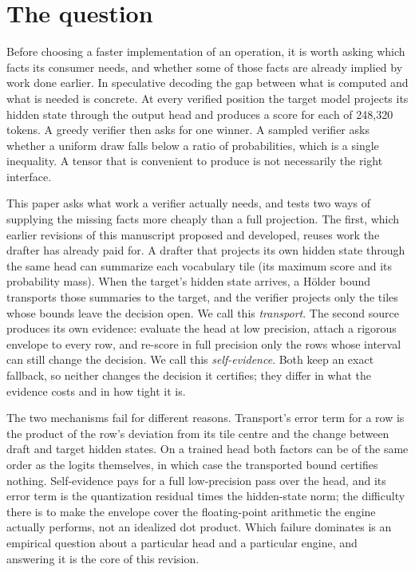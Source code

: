 \section{The question}\label{sec:question}
Before choosing a faster implementation of an operation, it is worth asking which facts its consumer needs, and whether some of those facts are already implied by work done earlier. In speculative decoding the gap between what is computed and what is needed is concrete. At every verified position the target model projects its hidden state through the output head and produces a score for each of 248,320 tokens. A greedy verifier then asks for one winner. A sampled verifier asks whether a uniform draw falls below a ratio of probabilities, which is a single inequality. A tensor that is convenient to produce is not necessarily the right interface.

This paper asks what work a verifier actually needs, and tests two ways of supplying the missing facts more cheaply than a full projection. The first, which earlier revisions of this manuscript proposed and developed, reuses work the drafter has already paid for. A drafter that projects its own hidden state through the same head can summarize each vocabulary tile (its maximum score and its probability mass). When the target's hidden state arrives, a Hölder bound transports those summaries to the target, and the verifier projects only the tiles whose bounds leave the decision open. We call this \emph{transport}. The second source produces its own evidence: evaluate the head at low precision, attach a rigorous envelope to every row, and re-score in full precision only the rows whose interval can still change the decision. We call this \emph{self-evidence}. Both keep an exact fallback, so neither changes the decision it certifies; they differ in what the evidence costs and in how tight it is.

The two mechanisms fail for different reasons. Transport's error term for a row is the product of the row's deviation from its tile centre and the change between draft and target hidden states. On a trained head both factors can be of the same order as the logits themselves, in which case the transported bound certifies nothing. Self-evidence pays for a full low-precision pass over the head, and its error term is the quantization residual times the hidden-state norm; the difficulty there is to make the envelope cover the floating-point arithmetic the engine actually performs, not an idealized dot product. Which failure dominates is an empirical question about a particular head and a particular engine, and answering it is the core of this revision.

